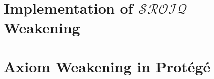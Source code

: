 \section{Implementation of \texorpdfstring{$\mathcal{SROIQ}$}{SROIQ} Weakening}



\section{Axiom Weakening in Protégé}


